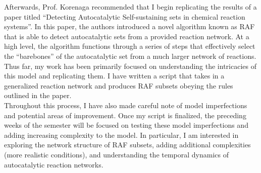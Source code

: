 \documentclass[12pt]{article}
\begin{document}
Afterwards, Prof. Korenaga recommended that I begin replicating the results of a paper titled “Detecting Autocatalytic Self-sustaining sets in chemical reaction systems”. In this paper, the authors  introduced a novel algorithm known as RAF that is able to detect autocatalytic sets from a provided reaction network. At a high level, the algorithm functions through a series of steps that effectively select the “barebones” of the autocatalytic set from a much larger network of reactions. Thus far, my work has been primarily focused on understanding the intricacies of this model and replicating them. I have written a script that takes in a generalized reaction network and produces RAF subsets obeying the rules outlined in the paper. \\

Throughout this process, I have also made careful note of model imperfections and potential areas of improvement. Once my script is finalized, the preceding weeks of the semester will be focused on testing these model imperfections and adding increasing complexity to the model. In particular, I am interested in exploring the network structure of RAF subsets, adding additional complexities (more realistic conditions), and understanding the temporal dynamics of autocatalytic reaction networks.
\end{document}

